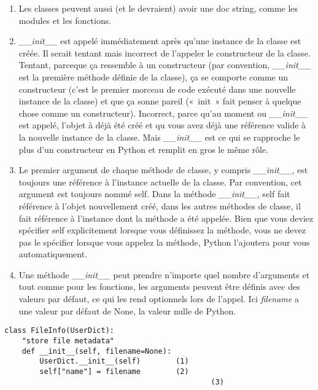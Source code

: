 \begin{enumerate}
\item{Les classes peuvent aussi (et le devraient) avoir une doc string, comme les modules et les fonctions.}
\item{\emph{\_\_init\_\_} est appelé immédiatement après qu'une instance de la classe est créée. Il serait tentant mais incorrect de l'appeler le constructeur de la classe. Tentant, parceque ça ressemble à un constructeur (par convention,  \emph{\_\_init\_\_} est la première méthode définie de la classe), ça se comporte comme un constructeur (c'est le premier morceau de code exécuté dans une nouvelle instance de la classe) et que ça sonne pareil («~init~» fait penser à quelque chose comme un constructeur). Incorrect, parce qu'au moment ou \emph{\_\_init\_\_} est appelé, l'objet à déjà été créé et qu vous avez déjà une référence valide à la nouvelle instance de la classe. Mais \emph{\_\_init\_\_} est ce qui se rapproche le plus d'un constructeur en Python et remplit en gros le même rôle.}
\item{Le premier argument de chaque méthode de classe, y compris \emph{\_\_init\_\_}, est toujours une référence à l'instance actuelle de la classe. Par convention, cet argument est toujours nommé self. Dans la méthode \emph{\_\_init\_\_}, self fait référence à l'objet nouvellement créé, dans les autres méthodes de classe, il fait référence à l'instance dont la méthode a été appelée. Bien que vous deviez spécifier self explicitement lorsque vous définissez la méthode, vous ne devez pas le spécifier lorsque vous appelez la méthode, Python l'ajoutera pour vous automatiquement.}
\item{Une méthode \emph{\_\_init\_\_} peut prendre n'importe quel nombre d'arguments et tout comme pour les fonctions, les arguments peuvent être définis avec des valeurs par défaut, ce qui les rend optionnels lors de l'appel. Ici \emph{filename} a une valeur par défaut de None, la valeur nulle de Python.}
\end{enumerate}


\begin{example}
\begin{lstlisting}
class FileInfo(UserDict):
    "store file metadata"
    def __init__(self, filename=None):
        UserDict.__init__(self)        (1)
        self["name"] = filename        (2)
                                               (3)
\end{lstlisting}
\end{example}

